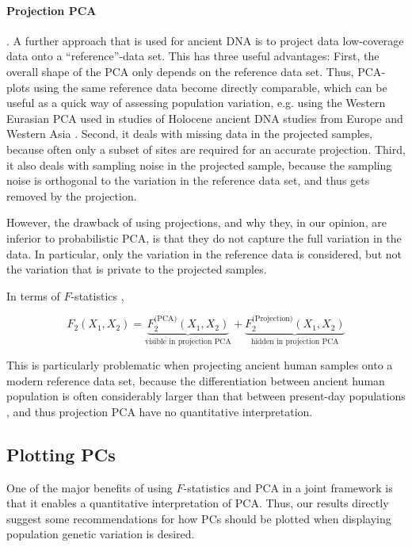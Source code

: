 \documentclass[12pt, letterpaper]{article}
\begin{document}
\paragraph{Projection PCA}. A further approach that is used for ancient DNA is to project data low-coverage data onto a ``reference''-data set. This has three useful advantages: First, the overall shape of the PCA only depends on the reference data set. Thus, PCA-plots using the same reference data become directly comparable, which can be useful as a quick way of assessing population variation, e.g. using the Western Eurasian PCA used in studies of Holocene ancient DNA studies from Europe and Western Asia \citep{haak_massive_2015}. Second, it deals with missing data in the projected samples, because often only a subset of sites are required for an accurate projection. Third, it also deals with sampling noise in the projected sample, because the sampling noise is orthogonal to the variation in the reference data set, and thus gets removed by the projection.

However, the drawback of using projections, and why they, in our opinion, are inferior to probabilistic PCA, is that they do not capture the full variation in the data. In particular, only the variation in the reference data is considered, but not the variation that is private to the projected samples. 

In terms of $F$-statistics \cite{peter_geometric_2022}, 

\begin{equation*}
    F_2(X_1, X_2) = \underbrace{F_2^{\text{(PCA)}}(X_1, X_2)}_{\text{visible in projection PCA}} + \underbrace{F_2^{\text{(Projection)}}(X_1, X_2)}_{\text{hidden in projection PCA}}
\end{equation*}

This is particularly problematic when projecting ancient human samples onto a modern reference data set, because the differentiation between ancient human population is often considerably larger than that between present-day populations \citep{haak_massive_2015, lazaridis_ancient_2014}, and thus projection PCA have no quantitative interpretation.


\subsection{Plotting PCs}
One of the major benefits of using $F$-statistics and PCA in a joint framework is that it enables a quantitative interpretation of PCA. Thus, our results directly suggest some recommendations for how PCs should be plotted when displaying population genetic variation is desired. 
\end{document}
